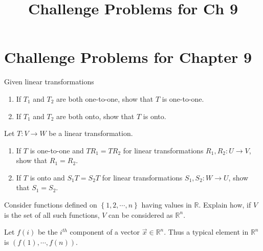 \documentclass{ximera}
\title{Challenge Problems for Ch 9} \license{CC BY-NC-SA 4.0}
\begin{document}
\begin{abstract}
\end{abstract}
\maketitle

\section*{Challenge Problems for Chapter 9}

\begin{problem}\label{prob:nich7.3.10}
    Given linear transformations 
    \begin{center}
\end{center}
\begin{enumerate}
    \item If $T_1$ and $T_2$ are both one-to-one, show that $T$ is one-to-one.
    \item If $T_1$ and $T_2$ are both onto, show that $T$ is onto.
\end{enumerate}
\end{problem}

\begin{problem}\label{prob:7.3.11}
Let $T:V\rightarrow W$ be a linear transformation.
\begin{enumerate}
    \item If $T$ is one-to-one and $TR_1=TR_2$ for linear transformations $R_1,R_2:U\rightarrow V$, show that $R_1=R_2$.
    \item If $T$ is onto and $S_1T=S_2T$ for linear transformations $S_1,S_2:W\rightarrow U$, show that $S_1=S_2$.
\end{enumerate}
    \end{problem}

\begin{problem}\label{prb:10.21} Consider functions defined on $\left\{ 1,2,\cdots ,n\right\} $ having
values in $\mathbb{R}$. Explain how, if $V$ is the set of all such
functions, $V$ can be considered as $\mathbb{R}^{n}$.
\begin{hint}
Let $f\left( i\right) $ be the $i^{th}$ component of a vector $
\vec{x}\in \mathbb{R}^{n}$. Thus a typical element in $\mathbb{R}^{n}$ is $
\left( f\left( 1\right) ,\cdots ,f\left( n\right) \right) $.
\end{hint}
\end{problem}
\end{document}
